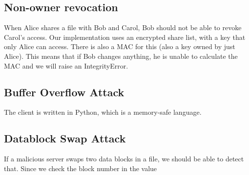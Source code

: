 \documentclass{article}
\begin{document}
\subsection{Non-owner revocation}
When Alice shares a file with Bob and Carol, Bob should not be able to revoke Carol's access.
Our implementation uses an encrypted share list, with a key that only Alice can access.
There is also a MAC for this (also a key owned by just Alice).
This means that if Bob changes anything, he is unable to calculate the MAC and we will raise
an IntegrityError.

\subsection{Buffer Overflow Attack}
The client is written in Python, which is a memory-safe language.

\subsection{Datablock Swap Attack}
If a malicious server swaps two data blocks in a file, we should be able to detect that.
Since we check the block number in the value 
\end{document}
